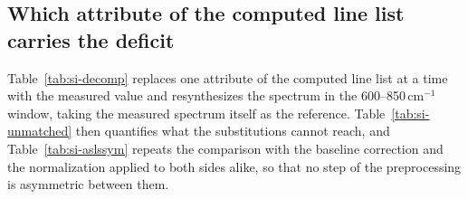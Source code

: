 \documentclass[11pt]{article}
\newcommand*\wn{\ensuremath{\text{cm}^{-1}}}
\begin{document}
\subsection{Which attribute of the computed line list carries the deficit}

Table~\ref{tab:si-decomp} replaces one attribute of the computed line list at a time with
the measured value and resynthesizes the spectrum in the 600--850\,\wn{} window, taking the
measured spectrum itself as the reference. Table~\ref{tab:si-unmatched} then quantifies
what the substitutions cannot reach, and Table~\ref{tab:si-aslssym} repeats the comparison
with the baseline correction and the normalization applied to both sides alike, so that no
step of the preprocessing is asymmetric between them.

\end{document}
